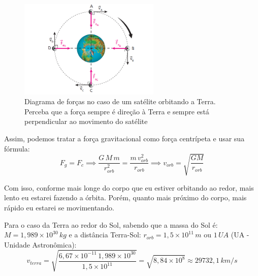 \documentclass[12pt]{extarticle}
\newcommand{\<}{\langle}
\renewcommand{\>}{\rangle}
\theoremstyle{definition}
\begin{document}
\begin{figure}[H]
    \centering
    \includegraphics[width=0.6\textwidth]{centripetal_force_gravitational.png}
    \caption{Diagrama de forças no caso de um satélite orbitando a Terra. Perceba que a força sempre é direção à Terra e sempre está perpendicular ao movimento do satélite}
    \label{fig:centripetal}
\end{figure}
Assim, podemos tratar a força gravitacional como força centrípeta e usar sua fórmula:
\begin{equation}
    F_g = F_c \implies \frac{G\,M\,m}{r_{orb}^2} = \frac{m\,v_{orb}^2}{r_{orb}} \implies \boxed{v_{orb} = \sqrt{\frac{GM}{r_{orb}}}}
\end{equation}

Com isso, conforme mais longe do corpo que eu estiver orbitando ao redor, mais lento eu estarei fazendo a órbita. Porém, quanto mais próximo do corpo, mais rápido eu estarei se movimentando.

Para o caso da Terra ao redor do Sol, sabendo que a massa do Sol é: $M=1,989\times10^{30}\,kg$ e a distância Terra-Sol: $r_{orb} = 1,5\times10^{11}\,m$ ou $1\,UA$ (UA - Unidade Astronômica):
\begin{equation}
    v_{terra}=\sqrt{\frac{6,67\times10^{-11}\,1,989\times10^{30}}{1,5\times10^{11}}}= \sqrt{8,84\times10^{8}} \approx 29732,1\,km/s
\end{equation}
\end{document}
